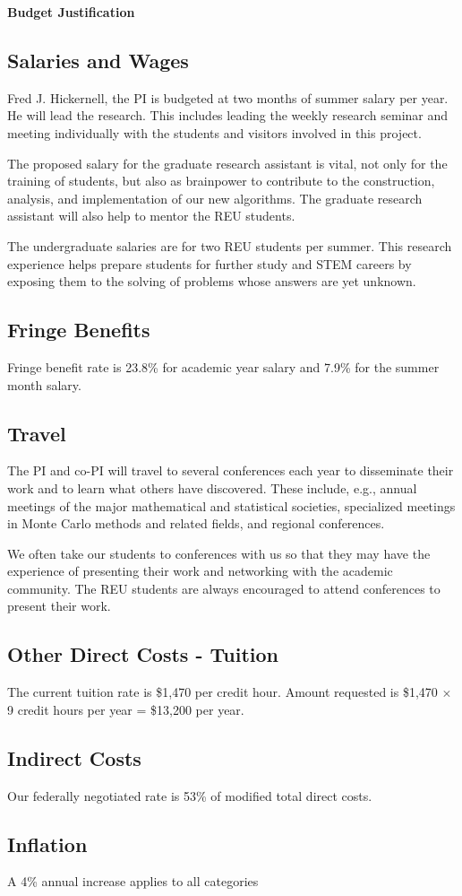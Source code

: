 \documentclass[11pt]{NSFamsart}
\begin{document}
\newpage \setcounter{page}{1} %

\centerline{\textbf{\Large Budget Justification}}

\subsection*{Salaries and Wages}

Fred J. Hickernell, the PI is budgeted at two months of summer salary per year.  He will lead 
the research.  This includes leading the weekly research seminar and  meeting individually with the 
students and visitors involved in this project.

The proposed salary for the graduate research assistant is vital, not only for the training of students, 
but also as brainpower to contribute to the construction, analysis, and implementation of our new 
algorithms.  The graduate research assistant will also help to mentor the REU students.

The undergraduate salaries are for two REU students per summer.  This research experience helps 
prepare students for further study and STEM careers by exposing them to the solving of problems 
whose answers are yet unknown.

\subsection*{Fringe Benefits}
Fringe benefit rate is 23.8\% for academic year salary and 7.9\% for the summer month
salary.

\subsection*{Travel}
The PI and co-PI will travel to several conferences each year to disseminate their work and to learn 
what others have discovered.  These include, e.g., annual meetings of the major mathematical and 
statistical societies, specialized meetings in Monte Carlo methods and related fields, and regional 
conferences. 

We often take our students to conferences with us so that they may have the experience of 
presenting their work and networking with the academic community.  The REU students are always 
encouraged to attend conferences to present their work. 

\subsection*{Other Direct Costs - Tuition}
The current tuition rate is \$1,470 per credit hour. Amount requested is 
\$1,470 $\times$ 9 credit hours per year = \$13,200 per year.

\subsection*{Indirect Costs}
Our federally negotiated rate is 53\% of modified total direct costs.

\subsection*{Inflation}A 4\% annual increase applies to all categories
\end{document}
